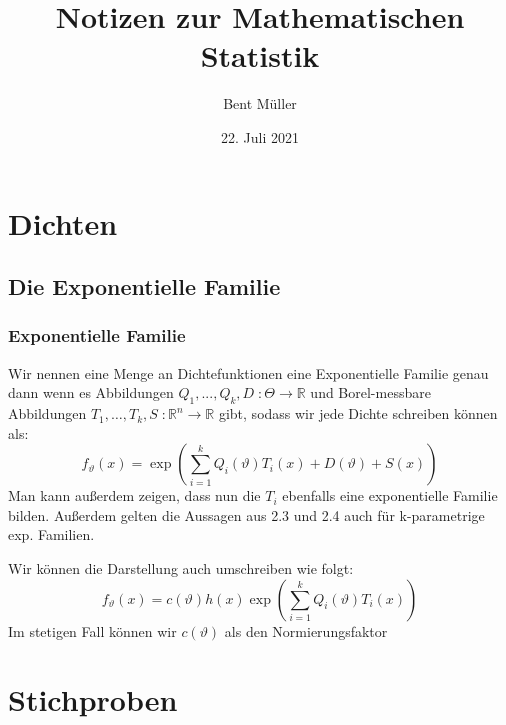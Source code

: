 \documentclass[a4paper]{article}
\author{Bent Müller}
\title{Notizen zur Mathematischen Statistik}
\date{22. Juli 2021}
\begin{document}
\maketitle
\tableofcontents
\pagebreak

\section{Dichten}
\subsection{Die Exponentielle Familie}

\begin{theorem} %
	\subsubsection{Exponentielle Familie}

	Wir nennen eine Menge an Dichtefunktionen eine Exponentielle Familie genau dann wenn
	es Abbildungen $Q_1, ..., Q_k, D \; : \Theta \to \mathbb{R}$ und Borel-messbare
	Abbildungen $T_1, \ldots, T_k, S \; : \mathbb{R} ^{n} \to \mathbb{R}$ gibt, sodass wir
	jede Dichte schreiben können als:
	\[
		f_{\vartheta} (x) = \exp \left(
			\sum_{i=1}^{k} Q_i (\vartheta) T_i (x) + D(\vartheta) + S(x)
		\right) 
	\]
	Man kann außerdem zeigen, dass nun die $T_i$ ebenfalls eine exponentielle Familie bilden.
	Außerdem gelten die Aussagen aus 2.3 und 2.4 auch für k-parametrige exp. Familien.

	Wir können die Darstellung auch umschreiben wie folgt:
	\[
		f_\vartheta (x) = c(\vartheta) h(x) \exp(\sum_{i=1}^{k} Q_i (\vartheta) T_i (x))
	\] 
	Im stetigen Fall können wir $c (\vartheta)$ als den Normierungsfaktor
\end{theorem}

\section{Stichproben}
\end{document}
